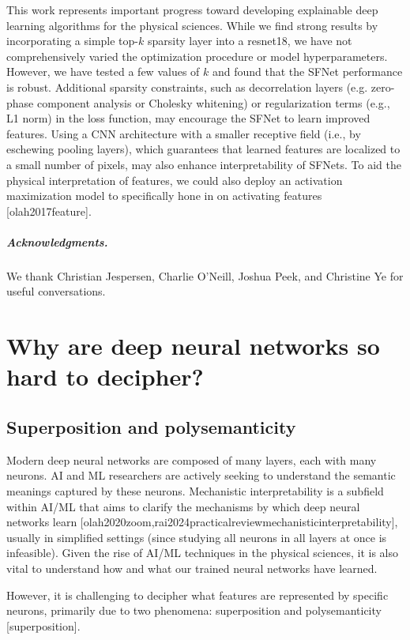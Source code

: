 \documentclass[11pt,a4paper]{article}
\begin{document}
This work represents important progress toward developing explainable deep learning algorithms for the physical sciences. While we find strong results by incorporating a simple top-$k$ sparsity layer into a resnet18, we have not comprehensively varied the optimization procedure or model hyperparameters. However, we have tested a few values of $k$ and found that the SFNet performance is robust. Additional sparsity constraints, such as decorrelation layers (e.g. zero-phase component analysis or Cholesky whitening) or regularization terms (e.g., L1 norm) in the loss function, may encourage the SFNet to learn improved features. Using a CNN architecture with a smaller receptive field (i.e., by eschewing pooling layers), which guarantees that learned features are localized to a small number of pixels, may also enhance interpretability of SFNets. To aid the physical interpretation of features, we could also deploy an activation maximization model to specifically hone in on activating features [olah2017feature].

\subparagraph{Acknowledgments.}

We thank Christian Jespersen, Charlie O'Neill, Joshua Peek, and Christine Ye for useful conversations.

\section{Why are deep neural networks so hard to decipher?}

\subsection{Superposition and polysemanticity}

Modern deep neural networks are composed of many layers, each with many neurons. AI and ML researchers are actively seeking to understand the semantic meanings captured by these neurons. Mechanistic interpretability is a subfield within AI/ML that aims to clarify the mechanisms by which deep neural networks learn [olah2020zoom,rai2024practicalreviewmechanisticinterpretability], usually in simplified settings (since studying all neurons in all layers at once is infeasible). Given the rise of AI/ML techniques in the physical sciences, it is also vital to understand how and what our trained neural networks have learned.

However, it is challenging to decipher what features are represented by specific neurons, primarily due to two phenomena: superposition and polysemanticity [superposition].
\end{document}
